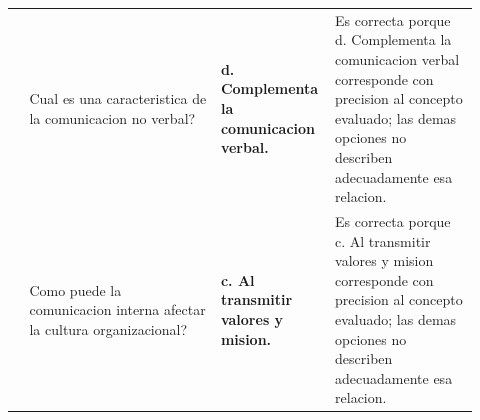 \documentclass[
	spanish,
	letterpaper, oneside
]{article}
\begin{document}
\begin{landscape}
\begin{longtable}{@{}>{\centering\arraybackslash}p{0.035\linewidth}>{\raggedright\arraybackslash}p{0.40\linewidth}>{\raggedright\arraybackslash}p{0.19\linewidth}>{\raggedright\arraybackslash}p{0.30\linewidth}@{}}
30 & Cual es una caracteristica de la comunicacion no verbal? & \textbf{d. Complementa la comunicacion verbal.} & Es correcta porque d. Complementa la comunicacion verbal corresponde con precision al concepto evaluado; las demas opciones no describen adecuadamente esa relacion. \\
31 & Como puede la comunicacion interna afectar la cultura organizacional? & \textbf{c. Al transmitir valores y mision.} & Es correcta porque c. Al transmitir valores y mision corresponde con precision al concepto evaluado; las demas opciones no describen adecuadamente esa relacion. \\
\end{longtable}
\endgroup
\end{landscape}
\pagestyle{fancy}
\clearpage

\end{document}
